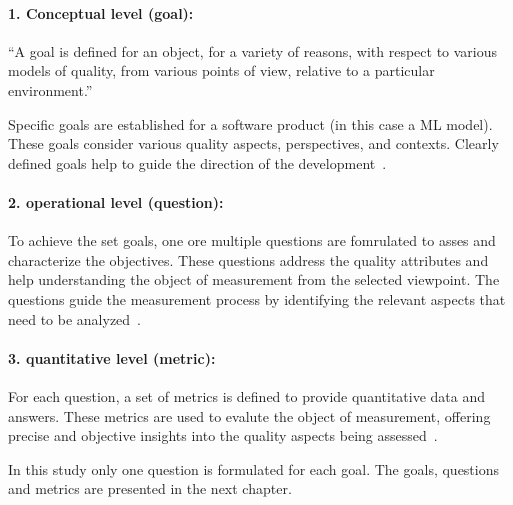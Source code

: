 \paragraph{1. Conceptual level (goal):}
``A goal is defined for an object, for a variety of reasons,
with respect to various models of quality, from various points of view, relative to a
particular environment.''~\cite[p. 3]{basili_goalquestionmetric_}

Specific goals are established for a software product (in this case a \ac{ML} model).
These goals consider various quality aspects, perspectives, and contexts.
Clearly defined goals help to guide the direction of the development~\cite[p. 3]{basili_goalquestionmetric_}.

\paragraph{2. operational level (question):}
To achieve the set goals, one ore multiple questions are fomrulated to asses and characterize the objectives.
These questions address the quality attributes and help understanding the object of measurement from the selected
viewpoint.
The questions guide the measurement process by identifying the relevant aspects that need to be
analyzed~\cite[p. 3]{basili_goalquestionmetric_}.

\paragraph{3. quantitative level (metric):}
For each question, a set of metrics is defined to provide quantitative data and answers.
These metrics are used to evalute the object of measurement, offering precise and objective insights into the
quality aspects being assessed~\cite[p. 3]{basili_goalquestionmetric_}.

In this study only one question is formulated for each goal.
The goals, questions and metrics are presented in the next chapter.
